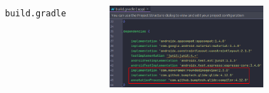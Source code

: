 \documentclass{beamer}
\begin{document}
\begin{frame}
\begin{columns}
\begin{figure}
        \end{figure}
        \indent \texttt{build.gradle}
        \begin{figure}
            \centering
            \includegraphics[width=\textwidth]{images/35.png}
        \end{figure}
    \end{columns}
\end{frame}
\end{document}
